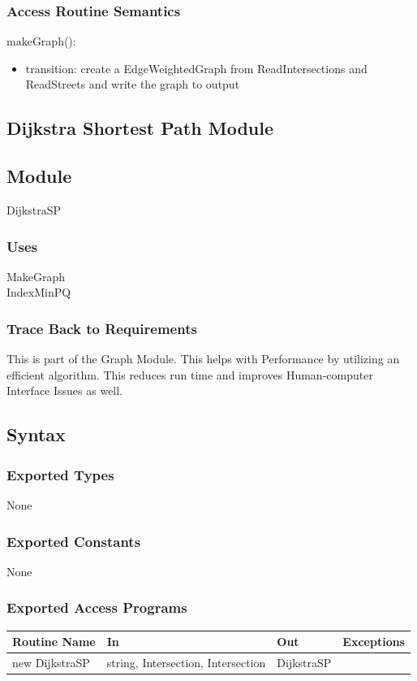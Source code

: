 \documentclass[12pt]{article}
\begin{document}
\subsubsection*{Access Routine Semantics}
\noindent makeGraph():
\begin{itemize}
    \item transition: create a EdgeWeightedGraph from ReadIntersections and ReadStreets and write the graph to output
\end{itemize}

\newpage
\subsection{Dijkstra Shortest Path Module}
\subsection*{Module}
DijkstraSP

\subsubsection*{Uses}
MakeGraph\\
IndexMinPQ

\subsubsection*{Trace Back to Requirements}
This is part of the Graph Module. This helps with Performance by utilizing an efficient algorithm. This reduces run time and improves Human-computer Interface Issues as well.

\subsection*{Syntax}
\subsubsection*{Exported Types}
None

\subsubsection*{Exported Constants}
None

\subsubsection*{Exported Access Programs}
    \begin{tabular}{|l|l|l|l|}
    \hline
    \textbf{Routine Name} & \textbf{In} & \textbf{Out} & \textbf{Exceptions}\\
    \hline
    new DijkstraSP & string, Intersection, Intersection & DijkstraSP & ~\\
    \hline
    \end{tabular}
    
\end{document}
